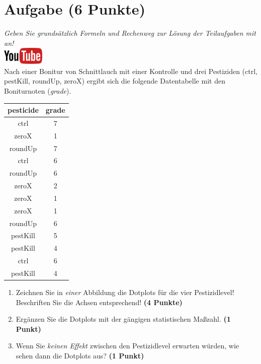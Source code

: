 \documentclass[a4paper, 10pt]{scrartcl}\usepackage[]{graphicx}\usepackage[]{xcolor}
\begin{document}
\section{Aufgabe \hfill (6 Punkte)}

\textit{Geben Sie grunds{\"a}tzlich Formeln und Rechenweg zur L{\"o}sung der
  Teilaufgaben mit an!} \\[1Ex]

\hfill\href{https://youtu.be/knAziLLQGb0}{\includegraphics[width =
  2cm]{img/youtube}}\\[1Ex]

Nach einer Bonitur von Schnittlauch mit einer Kontrolle und drei Pestiziden (ctrl, pestKill, roundUp, zeroX) ergibt sich die folgende Datentabelle mit den Boniturnoten (\textit{grade}). 

\begin{table}[!h]
\centering
\begin{tabular}{cc}
\toprule
pesticide & grade\\
\midrule
ctrl & 7\\
zeroX & 1\\
roundUp & 7\\
ctrl & 6\\
roundUp & 6\\
\addlinespace
zeroX & 2\\
zeroX & 1\\
zeroX & 1\\
roundUp & 6\\
pestKill & 5\\
\addlinespace
pestKill & 4\\
ctrl & 6\\
pestKill & 4\\
\bottomrule
\end{tabular}
\end{table}



\begin{enumerate}
\item Zeichnen Sie in \textit{einer} Abbildung die Dotplots f{\"u}r die
  vier Pestizidlevel! Beschriften Sie die Achsen entsprechend!
  \textbf{(4 Punkte)}
\item Erg{\"a}nzen Sie die Dotplots mit der g{\"a}ngigen
  statistischen Ma{\ss}zahl. \textbf{(1 Punkt)}
\item Wenn Sie \textit{keinen Effekt} zwischen den Pestizidlevel erwarten
  w{\"u}rden, wie sehen dann die Dotplots aus? \textbf{(1 Punkt)}
\end{enumerate} 
\clearpage
\end{document}
